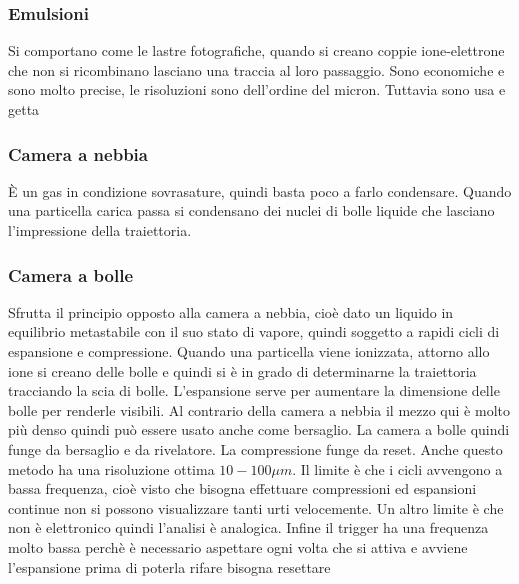 \documentclass[12pt]{book}
\begin{document}
\subsubsection{Emulsioni}
Si comportano come le lastre fotografiche, quando si creano coppie ione-elettrone che non si ricombinano lasciano una traccia al loro passaggio. Sono economiche e sono molto precise, le risoluzioni sono dell'ordine del micron. Tuttavia sono usa e getta

\subsubsection{Camera a nebbia}
È un gas in condizione sovrasature, quindi basta poco a farlo condensare. Quando una particella carica passa si condensano dei nuclei di bolle liquide che lasciano l'impressione della traiettoria.

\subsubsection{Camera a bolle}
Sfrutta il principio opposto alla camera a nebbia, cioè dato un liquido in equilibrio metastabile con il suo stato di vapore, quindi soggetto a rapidi cicli di espansione e compressione. Quando una particella viene ionizzata, attorno allo ione si creano delle bolle e quindi si è in grado di determinarne la traiettoria tracciando la scia di bolle. L'espansione serve per aumentare la dimensione delle bolle per renderle visibili. Al contrario della camera a nebbia il mezzo qui è molto più denso quindi può essere usato anche come bersaglio. La camera a bolle quindi funge da bersaglio e da rivelatore. La compressione funge da reset. Anche questo metodo ha una risoluzione ottima $10-100 \mu m$. Il limite è che i cicli avvengono a bassa frequenza, cioè visto che bisogna effettuare compressioni ed espansioni continue non si possono visualizzare tanti urti velocemente. Un altro limite è che non è elettronico quindi l'analisi è analogica. Infine il trigger ha una frequenza molto bassa perchè è necessario aspettare ogni volta che si attiva e avviene l'espansione prima di poterla rifare bisogna resettare 
\end{document}
